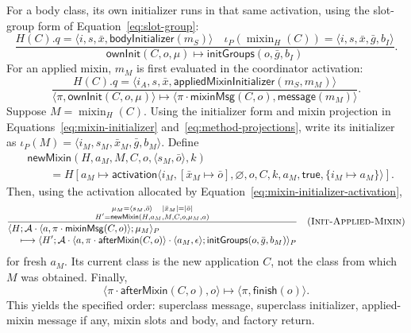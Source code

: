 \documentclass[11pt]{article}
\numberwithin{equation}{section}
\newcommand{\kw}[1]{\ensuremath{\mathsf{#1}}}
\newcommand{\mixin}{\mathop{\mathrm{mixin}}}
\newcommand{\rulelabel}[1]{\textsc{#1}}
\begin{document}
For a body class, its own initializer runs in that same activation, using the
slot-group form of Equation~\eqref{eq:slot-group}:
\begin{equation}\label{eq:body-own-init}
\dfrac{H(C).q=\langle i,s,\bar x,\kw{bodyInitializer}(m_S)\rangle\quad
       \iota_P(\mixin_H(C))=\langle i,s,\bar x,\bar g,b_I\rangle}
 {\kw{ownInit}(C,o,\mu)
  \longmapsto\kw{initGroups}(o,\bar g,b_I)}.
\end{equation}
For an applied mixin, $m_M$ is first evaluated in the coordinator activation:
\begin{equation}\label{eq:applied-own-init}
\dfrac{H(C).q=\langle i_A,s,\bar x,\kw{appliedMixinInitializer}(m_S,m_M)\rangle}
 {\langle\pi,\kw{ownInit}(C,o,\mu)\rangle
  \longmapsto
  \langle\pi\cdot\kw{mixinMsg}(C,o),\kw{message}(m_M)\rangle}.
\end{equation}
Suppose $M=\mixin_H(C)$.  Using the initializer form and mixin projection in
Equations~\eqref{eq:mixin-initializer} and~\eqref{eq:method-projections}, write
its initializer as
$\iota_P(M)=\langle i_M,s_M,\bar x_M,\bar g,b_M\rangle$.  Define
\begin{equation}\label{eq:mixin-initializer-activation}
\begin{aligned}
 &\mathsf{newMixin}(H,a_M,M,C,o,
                    \langle s_M,\bar o\rangle,k)\\
 &\qquad=H[a_M\mapsto\kw{activation}\langle
 i_M,[\bar x_M\mapsto\bar o],\varnothing,o,C,k,a_M,\kw{true},
 \{i_M\mapsto a_M\}\rangle].
\end{aligned}
\end{equation}
Then, using the activation allocated by
Equation~\eqref{eq:mixin-initializer-activation},
\[
\dfrac{\substack{\mu_M=\langle s_M,\bar o\rangle\quad
       |\bar x_M|=|\bar o|\\
       H'=\mathsf{newMixin}(H,a_M,M,C,o,\mu_M,a)}}
 {\begin{aligned}
  &\langle H;\mathcal A\cdot\langle a,
       \pi\cdot\kw{mixinMsg}(C,o)\rangle;\mu_M\rangle_P\\[-1mm]
  &\quad\longmapsto
   \langle H';\mathcal A\cdot
       \langle a,\pi\cdot\kw{afterMixin}(C,o)\rangle
       \cdot\langle a_M,\epsilon\rangle;
       \kw{initGroups}(o,\bar g,b_M)\rangle_P
 \end{aligned}}
\quad(\rulelabel{Init-Applied-Mixin})
\]
for fresh $a_M$.  Its current class is the new application $C$, not the class
from which $M$ was obtained.  Finally,
\begin{equation}\label{eq:after-mixin}
 \langle\pi\cdot\kw{afterMixin}(C,o),o\rangle
 \longmapsto\langle\pi,\kw{finish}(o)\rangle.
\end{equation}
This yields the specified order: superclass message, superclass initializer,
applied-mixin message if any, mixin slots and body, and factory return.
\end{document}
